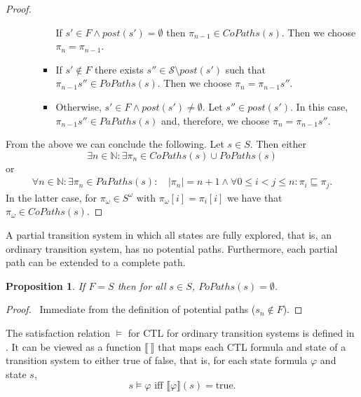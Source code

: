 \documentclass[12pt]{article}
\newtheorem{proposition}{Proposition}
\theoremstyle{definition}
\newcommand{\satisfaction}[1]{\llbracket #1 \rrbracket}
\newenvironment{franck}{\color{red}}{\color{black}}
\begin{document}
\begin{franck}
\begin{proof}
\begin{itemize}
\begin{itemize}
\begin{itemize}
If $s' \in F \wedge \mathit{post}(s') = \emptyset$ then $\pi_{n-1} \in \mathit{CoPaths}(s)$.  Then we choose $\pi_n = \pi_{n-1}$.
\item
If $s' \not\in F$ there exists $s'' \in \mathcal{S} \setminus \mathit{post}(s')$ such that $\pi_{n-1} s'' \in \mathit{PoPaths}(s)$.  Then we choose $\pi_n = \pi_{n-1} s''$.
\item
Otherwise, $s' \in F \wedge \mathit{post}(s') \not= \emptyset$.  Let $s'' \in \mathit{post}(s')$.  In this case, $\pi_{n-1} s'' \in \mathit{PaPaths}(s)$ and, therefore, we choose $\pi_n = \pi_{n-1} s''$.
\end{itemize}
\end{itemize}
\end{itemize}
From the above we can conclude the following.  Let $s \in S$.  Then either
\[
\exists n \in \mathbb{N} : \exists \pi_n \in \mathit{CoPaths}(s) \cup \mathit{PoPaths}(s) 
\]
or
\begin{align*}
\forall n \in \mathbb{N} : \exists \pi_n \in \mathit{PaPaths}(s) :\, & |\pi_n| = n + 1 \wedge \forall 0 \leq i < j \leq n: \pi_i \sqsubseteq \pi_j.
\end{align*}
In the latter case, for $\pi_{\omega} \in S^{\omega}$ with $\pi_{\omega}[i] = \pi_i[i]$ we have that $\pi_{\omega} \in \mathit{CoPaths}(s)$.
\end{proof}
\end{franck}

A partial transition system in which all states are fully explored, that is, an ordinary transition system, has no potential paths.  Furthermore, each partial path can be extended to a complete path.

\begin{proposition}
\label{proposition:no-potential-paths}
If $F= S$ then for all $s \in S$, $\mathit{PoPaths}(s) = \emptyset$.
\end{proposition}
\begin{proof}\ 
Immediate from the definition of potential paths ($s_n \not\in F$).
\end{proof}

The satisfaction relation $\models$ for CTL for ordinary transition systems is defined in \cite[Definition~6.4]{BK08}.  It can be viewed as a function $\satisfaction{\ }$ that maps each CTL formula and state of a transition system to either true of false, that is, for each state formula $\varphi$ and state $s$,
\[
s \models \varphi \mbox{ iff } \satisfaction{\varphi}(s) = \mbox{true}.
\]
\end{document}
